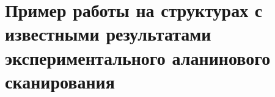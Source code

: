\newpage




\newpage
\section{Пример работы на структурах с известными результатами  экспериментального аланинового сканирования}






